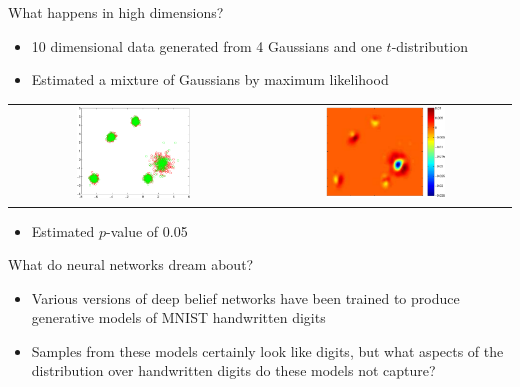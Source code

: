 \begin{frame}{What happens in high dimensions?}
  \begin{itemize}
    \item 10 dimensional data generated from 4 Gaussians and one $t$-distribution
    \vspace{\baselineskip}
    \pause
    \item Estimated a mixture of Gaussians by maximum likelihood
  \end{itemize}
  \pause
  \begin{center}
  \begin{tabular}{cc}
    \includegraphics[width=0.48\textwidth]{figures/high_mog_pca} &
    \pause
    \includegraphics[width=0.50\textwidth]{figures/high_mog_witness}
  \end{tabular}
  \end{center}
  \pause
  \begin{itemize}
    \item Estimated $p$-value of 0.05
  \end{itemize}
\end{frame}

\begin{frame}{What do neural networks dream about?}
  \begin{itemize}
    \item Various versions of deep belief networks have been trained to produce generative models of MNIST handwritten digits
    \vspace{\baselineskip}
    \pause
    \item Samples from these models certainly look like digits, but what aspects of the distribution over handwritten digits do these models not capture?
  \end{itemize}
\end{frame}

